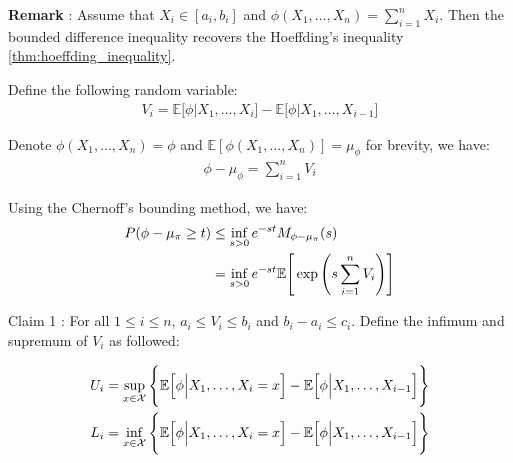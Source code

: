 \noindent\textbf{Remark} : Assume that $X_i\in[a_i, b_i]$ and $\phi(X_1, \dots, X_n)=\sum_{i=1}^n X_i$. Then the bounded difference inequality recovers the Hoeffding's inequality \ref{thm:hoeffding_inequality}.

\begin{proof*}
    Define the following random variable:
    \begin{align*}
        V_i = \mathbb{E}\Big[\phi\Big|X_1, \dots, X_i\Big] - \mathbb{E}\Big[\phi\Big|X_1, \dots, X_{i-1}\Big]
    \end{align*}

    \noindent Denote $\phi(X_1, \dots, X_n)=\phi$ and $\mathbb{E}[\phi(X_1, \dots, X_n)] = \mu_\phi$ for brevity, we have:
    \begin{align*}
        \phi - \mu_\phi = \sum_{i=1}^n V_i
    \end{align*}

    \noindent Using the Chernoff's bounding method, we have:
    \begin{align*}
        P(\phi - \mu_\pi \ge t) 
            &\le \inf_{s>0}e^{-st}M_{\phi-\mu_\pi}(s) \\
            &= \inf_{s>0}e^{-st}\mathbb{E}\Bigg[ 
                \exp\Bigg( 
                    s\sum_{i=1}^n V_i
                 \Bigg)
             \Bigg]
    \end{align*}

    \begin{subproof}{\newline Claim 1 : For all $1\le i\le n$, $a_i\le V_i \le b_i$ and $b_i-a_i\le c_i$.}
        Define the infimum and supremum of $V_i$ as followed:

        \begin{align*}
            U_i &= \sup_{x\in\mathcal{X}}\Bigg\{ 
                \mathbb{E}\Big[ \phi \Big| X_1, \dots, X_i=x \Big] - \mathbb{E}\Big[ \phi\Big|X_1, \dots, X_{i-1} \Big]
             \Bigg\} \\
            L_i &= \inf_{x\in\mathcal{X}}\Bigg\{ 
                \mathbb{E}\Big[ \phi \Big| X_1, \dots, X_i=x \Big] - \mathbb{E}\Big[ \phi\Big|X_1, \dots, X_{i-1} \Big]
             \Bigg\}
        \end{align*}


\end{subproof}
\end{proof*}

